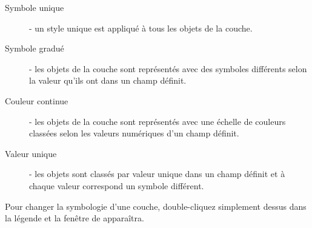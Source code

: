 \begin{description}
\item[Symbole unique] - un style unique est appliqu\'e \`a tous les objets de la couche.
\item[Symbole gradu\'e] - les objets de la couche sont repr\'esent\'es avec des symboles diff\'erents selon la valeur qu'ils ont dans un champ d\'efinit.
\item[Couleur continue] - les objets de la couche sont repr\'esent\'es avec une \'echelle de couleurs class\'ees selon les valeurs num\'eriques d'un champ d\'efinit.
\item[Valeur unique] - les objets sont class\'es par valeur unique dans un champ d\'efinit et \`a chaque valeur correspond un symbole diff\'erent.
\end{description}

Pour changer la symbologie d'une couche, double-cliquez simplement dessus dans la l\'egende et la fen\^etre de  appara\^itra.

